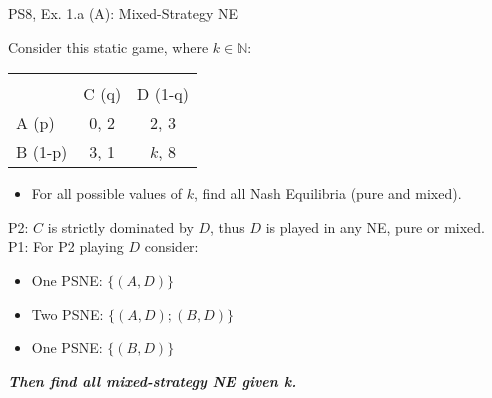 \begin{frame}{PS8, Ex. 1.a (A): Mixed-Strategy NE}
    \begin{multicols}{2}
      Consider this static game, where $k\in\mathbb{N}:$
      \vspace{-16pt}
      \begin{table}
        \begin{tabular}{l|c|c|}
          \multicolumn{1}{c}{} & \multicolumn{2}{c}{} \\
          \multicolumn{1}{c}{} & \multicolumn{1}{c}{C (q)} & \multicolumn{1}{c}{\color{blue}D (1-q)} \\\cline{2-3}
          A (p)   & 0, 2 & 2, \color{blue}3 \\\cline{2-3}
          B (1-p) & 3, 1 & $k$, \color{blue}8 \\\cline{2-3}
        \end{tabular}
      \end{table}
      \begin{itemize}
        \item[(a)] For all possible values of $k$, find all Nash Equilibria (pure and mixed).
      \end{itemize}
      P2: $C$ is strictly dominated by $D$, thus $D$ is played in any NE, pure or mixed.\\\medskip
      P1: For P2 playing $D$ consider:
      \begin{itemize}
        \item[$k=$1:] One PSNE: $\{(A,D)\}$
        \item[$k=$2:] Two PSNE: $\{(A,D);(B,D)\}$
        \item[$k\geq$3:] One PSNE: $\{(B,D)\}$
      \end{itemize}
      \textbf{\textit{Then find all mixed-strategy NE given k.}}
      \vfill\null\columnbreak
      \vfill\null
    \end{multicols}
\end{frame}
